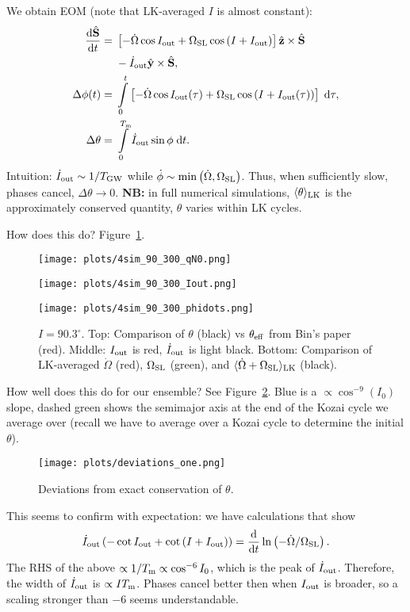 \documentclass[11pt,
        usenames, %
        dvipsnames, %
        twocolumn,
    ]{article}
\newcommand*{\rd}[2]{\frac{\mathrm{d}#1}{\mathrm{d}#2}}
\newcommand*{\bm}[1]{\boldsymbol{\mathbf{#1}}}
\newcommand*{\uv}[1]{\hat{\bm{#1}}}
\newcommand*{\ev}[1]{\langle#1\rangle}
\newcommand*{\p}[1]{\left(#1\right)}
\newcommand*{\s}[1]{\left[#1\right]}
\begin{document}
We obtain EOM (note that LK-averaged $I$ is almost constant):
\begin{align}
    \rd{\uv{S}}{t} ={}& \s{-\dot{\Omega}\cos I_{\rm out}
        + \Omega_{\rm SL}\cos \p{I + I_{\rm out}}}\uv{z} \times
        \uv{S}\nonumber\\
        &- \dot{I}_{\rm out} \uv{y} \times \uv{S},\\
    \Delta \phi(t) ={}& \int\limits_0^t \s{-\dot{\Omega}\cos I_{\rm out}(\tau)
        + \Omega_{\rm SL}\cos \p{I + I_{\rm out}(\tau)}}
            \;\mathrm{d}\tau,\\
    \Delta \theta ={}& \int\limits_0^{T_{\rm m}}
        \dot{I}_{\rm out} \sin \phi\;\mathrm{d}t.
\end{align}
Intuition: $\dot{I}_{\rm out} \sim 1 / T_{\rm GW}$ while $\dot{\phi} \sim
\min\p{\dot{\Omega}, \Omega_{\rm SL}}$. Thus, when sufficiently slow, phases
cancel, $\Delta \theta \to 0$. \textbf{NB:} in full numerical simulations,
$\ev{\theta}_{\rm LK}$ is the approximately conserved quantity, $\theta$ varies
within LK cycles.

How does this do? Figure~\ref{fig:plots}.
\begin{figure}[h]
    \centering
    \texttt{[image: plots/4sim\_90\_300\_qN0.png]}

    \texttt{[image: plots/4sim\_90\_300\_Iout.png]}

    \texttt{[image: plots/4sim\_90\_300\_phidots.png]}
    \caption{$I = 90.3^\circ$. Top: Comparison of $\theta$ (black) vs
    $\theta_{\rm eff}$ from Bin's paper (red). Middle: $I_{\rm out}$ is
    red, $\dot{I}_{\rm out}$ is light black. Bottom: Comparison of LK-averaged
    $\dot{\Omega}$ (red), $\Omega_{\rm SL}$ (green), and $\ev{\dot{\Omega} +
    \Omega_{\rm SL}}_{\rm LK}$ (black).}\label{fig:plots}
\end{figure}

\clearpage

How well does this do for our ensemble? See Figure~\ref{fig:deviations}.
Blue is a $\propto \cos^{-9}(I_0)$ slope, dashed green shows the semimajor axis
at the end of the Kozai cycle we average over (recall we have to average over a
Kozai cycle to determine the initial $\theta$).
\begin{figure}[h]
    \centering
    \texttt{[image: plots/deviations\_one.png]}
    \caption{Deviations from exact conservation of
    $\theta$.}\label{fig:deviations}
\end{figure}

This seems to confirm with expectation: we have calculations that show
\begin{equation}
    \dot{I}_{\rm out}\p{-\cot I_{\rm out} + \cot \p{I + I_{\rm out}}}
        = \rd{}{t}\ln \p{-\dot{\Omega} / \Omega_{\rm SL}}.
\end{equation}
The RHS of the above $\propto 1 / T_{\rm m} \propto \cos^{-6}I_0$, which is the
peak of $\dot{I}_{\rm out}$. Therefore, the width of $\dot{I}_{\rm out}$ is
$\propto I T_{\rm m}$. Phases cancel better then when $I_{\rm out}$ is broader,
so a scaling stronger than $-6$ seems understandable.
\end{document}
